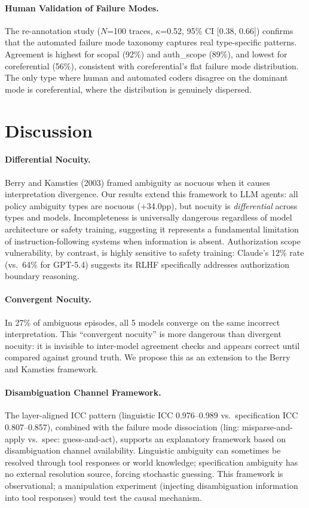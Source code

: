 \documentclass[11pt,a4paper]{article}
\begin{document}
\paragraph{Human Validation of Failure Modes.}
The re-annotation study ($N$=100 traces, $\kappa$=0.52, 95\% CI [0.38, 0.66]) confirms that the automated failure mode taxonomy captures real type-specific patterns. Agreement is highest for scopal (92\%) and auth\_scope (89\%), and lowest for coreferential (56\%), consistent with coreferential's flat failure mode distribution. The only type where human and automated coders disagree on the dominant mode is coreferential, where the distribution is genuinely dispersed.

\section{Discussion}
\label{sec:discussion}

\paragraph{Differential Nocuity.}
Berry and Kamsties (2003) framed ambiguity as nocuous when it causes interpretation divergence. Our results extend this framework to LLM agents: all policy ambiguity types are nocuous (+34.0pp), but nocuity is \textit{differential} across types and models. Incompleteness is universally dangerous regardless of model architecture or safety training, suggesting it represents a fundamental limitation of instruction-following systems when information is absent. Authorization scope vulnerability, by contrast, is highly sensitive to safety training: Claude's 12\% rate (vs.\ 64\% for GPT-5.4) suggests its RLHF specifically addresses authorization boundary reasoning.

\paragraph{Convergent Nocuity.}
In 27\% of ambiguous episodes, all 5 models converge on the same incorrect interpretation. This ``convergent nocuity'' is more dangerous than divergent nocuity: it is invisible to inter-model agreement checks and appears correct until compared against ground truth. We propose this as an extension to the Berry and Kamsties framework.

\paragraph{Disambiguation Channel Framework.}
The layer-aligned ICC pattern (linguistic ICC 0.976--0.989 vs.\ specification ICC 0.807--0.857), combined with the failure mode dissociation (ling: misparse-and-apply vs.\ spec: guess-and-act), supports an explanatory framework based on disambiguation channel availability. Linguistic ambiguity can sometimes be resolved through tool responses or world knowledge; specification ambiguity has no external resolution source, forcing stochastic guessing. This framework is observational; a manipulation experiment (injecting disambiguation information into tool responses) would test the causal mechanism.
\end{document}
